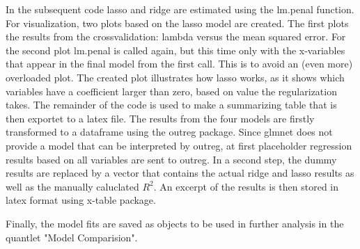In the subsequent code lasso and ridge are estimated using the lm.penal function.  For visualization, two plots based on the lasso model are created. The first plots the results from the crossvalidation: lambda versus the mean squared error. For the second plot lm.penal is called again, but this time only with the x-variables that appear in the final model from the first call. This is to avoid an (even more) overloaded plot. The created plot illustrates how lasso works, as it shows which variables have a coefficient larger than zero, based on value  the regularization takes. 
The remainder of the code is used to make a summarizing table that is then exportet to  a latex file. The results from the four models are firstly transformed to a dataframe using the outreg package. Since glmnet does not provide  a model that can be interpreted by outreg, at first placeholder regression results based on all variables are sent to outreg. In a second step, the dummy results are replaced by a vector that contains the actual ridge and lasso results as well as the manually caluclated $R^{2}$.  An excerpt of the results is then stored in latex format using x-table package. 

Finally, the model fits are saved as objects to be used in further analysis in the quantlet "Model Comparision". 


